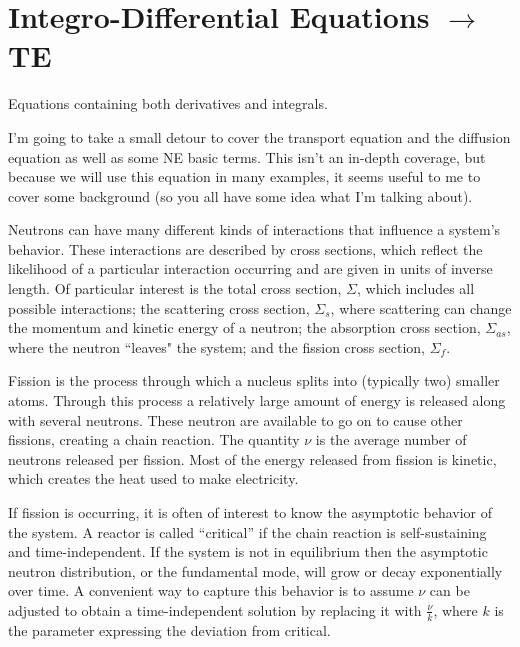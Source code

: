 \documentclass[12pt]{article}
\newcommand{\Macro}{\ensuremath{\Sigma}}
\begin{document}



\section{Integro-Differential Equations $\rightarrow$ TE}

Equations containing both derivatives and integrals. 

I'm going to take a small detour to cover the transport equation and the diffusion equation as well as some NE basic terms. This isn't an in-depth coverage,  but because we will use this equation in many examples, it seems useful to me to cover some background (so you all have some idea what I'm talking about).

Neutrons can have many different kinds of interactions that influence a system's behavior. These interactions are described by cross sections, which reflect the likelihood of a particular interaction occurring and are given in units of inverse length. Of particular interest is the total cross section, $\Macro$, which includes all possible interactions; the scattering cross section, $\Macro_{s}$, where scattering can change the momentum and kinetic energy of a neutron; the absorption cross section, $\Macro_{as}$, where the neutron ``leaves" the system; and the fission cross section, $\Macro_{f}$.   

Fission is the process through which a nucleus splits into (typically two) smaller atoms. Through this process a relatively large amount of energy is released along with several neutrons. These neutron are available to go on to cause other fissions, creating a chain reaction. The quantity $\nu$ is the average number of neutrons released per fission. Most of the energy released from fission is kinetic, which creates the heat used to make electricity.  

If fission is occurring, it is often of interest to know the asymptotic behavior of the system. A reactor is called ``critical'' if the chain reaction is self-sustaining and time-independent. If the system is not in equilibrium then the asymptotic neutron distribution, or the fundamental mode, will grow or decay exponentially over time. A convenient way to capture this behavior is to assume $\nu$ can be adjusted to obtain a time-independent solution by replacing it with $\frac{\nu}{k}$, where $k$ is the parameter expressing the deviation from critical. 
\end{document}
